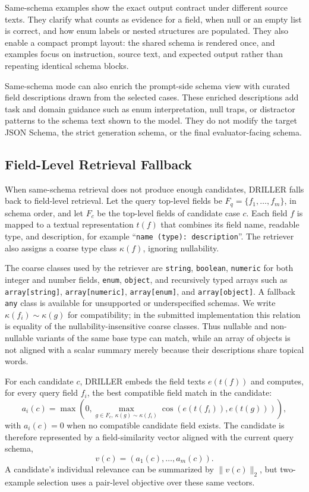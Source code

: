 Same-schema examples show the exact output contract under different source texts. They clarify what counts as evidence for a field, when null or an empty list is correct, and how enum labels or nested structures are populated. They also enable a compact prompt layout: the shared schema is rendered once, and examples focus on instruction, source text, and expected output rather than repeating identical schema blocks.

Same-schema mode can also enrich the prompt-side schema view with curated field descriptions drawn from the selected cases. These enriched descriptions add task and domain guidance such as enum interpretation, null traps, or distractor patterns to the schema text shown to the model. They do not modify the target JSON Schema, the strict generation schema, or the final evaluator-facing schema.

\subsection{Field-Level Retrieval Fallback}

When same-schema retrieval does not produce enough candidates, DRILLER falls back to field-level retrieval. Let the query top-level fields be \(F_q=\{f_1,\ldots,f_m\}\), in schema order, and let \(F_c\) be the top-level fields of candidate case \(c\). Each field \(f\) is mapped to a textual representation \(t(f)\) that combines its field name, readable type, and description, for example ``\texttt{name (type): description}''. The retriever also assigns a coarse type class \(\kappa(f)\), ignoring nullability.

The coarse classes used by the retriever are \texttt{string}, \texttt{boolean}, \texttt{numeric} for both integer and number fields, \texttt{enum}, \texttt{object}, and recursively typed arrays such as \texttt{array[string]}, \texttt{array[numeric]}, \texttt{array[enum]}, and \texttt{array[object]}. A fallback \texttt{any} class is available for unsupported or underspecified schemas. We write \(\kappa(f_i)\sim\kappa(g)\) for compatibility; in the submitted implementation this relation is equality of the nullability-insensitive coarse classes. Thus nullable and non-nullable variants of the same base type can match, while an array of objects is not aligned with a scalar summary merely because their descriptions share topical words.

For each candidate \(c\), DRILLER embeds the field texts \(e(t(f))\) and computes, for every query field \(f_i\), the best compatible field match in the candidate:
\[
a_i(c)=
\max\left(0,\max_{g\in F_c,\ \kappa(g)\sim\kappa(f_i)}
\cos(e(t(f_i)),e(t(g)))\right),
\]
with \(a_i(c)=0\) when no compatible candidate field exists. The candidate is therefore represented by a field-similarity vector aligned with the current query schema,
\[
v(c)=(a_1(c),\ldots,a_m(c)).
\]
A candidate's individual relevance can be summarized by \(\lVert v(c)\rVert_2\), but two-example selection uses a pair-level objective over these same vectors.

